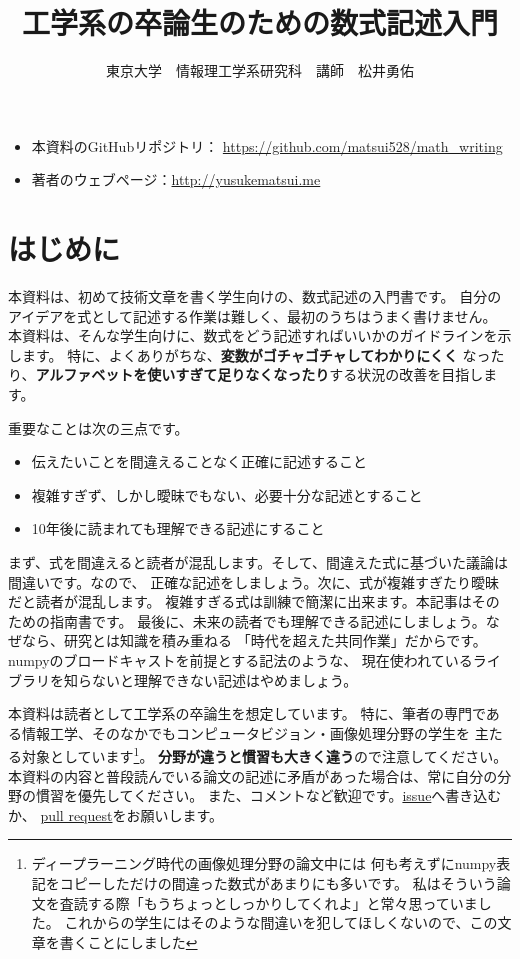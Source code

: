 \documentclass[uplatex,twocolumn,9pt,dvipdfmx]{jsarticle}
\begin{document}
\title{工学系の卒論生のための数式記述入門}
\author{東京大学　情報理工学系研究科　講師　松井勇佑}
\maketitle

\begin{screen}
    \begin{itemize}
    \item 本資料のGitHubリポジトリ： \url{https://github.com/matsui528/math_writing}
    \item 著者のウェブページ：\url{http://yusukematsui.me}
    \end{itemize}
\end{screen}

\section{はじめに}

本資料は、初めて技術文章を書く学生向けの、数式記述の入門書です。
自分のアイデアを式として記述する作業は難しく、最初のうちはうまく書けません。
本資料は、そんな学生向けに、数式をどう記述すればいいかのガイドラインを示します。
特に、よくありがちな、\textbf{変数がゴチャゴチャしてわかりにくく}
なったり、\textbf{アルファベットを使いすぎて足りなくなったり}する状況の改善を目指します。

重要なことは次の三点です。
\begin{itemize}
    \item 伝えたいことを間違えることなく正確に記述すること
    \item 複雑すぎず、しかし曖昧でもない、必要十分な記述とすること
    \item 10年後に読まれても理解できる記述にすること
\end{itemize}
まず、式を間違えると読者が混乱します。そして、間違えた式に基づいた議論は間違いです。なので、
正確な記述をしましょう。次に、式が複雑すぎたり曖昧だと読者が混乱します。
複雑すぎる式は訓練で簡潔に出来ます。本記事はそのための指南書です。
最後に、未来の読者でも理解できる記述にしましょう。なぜなら、研究とは知識を積み重ねる
「時代を超えた共同作業」だからです。numpyのブロードキャストを前提とする記法のような、
現在使われているライブラリを知らないと理解できない記述はやめましょう。


本資料は読者として工学系の卒論生を想定しています。
特に、筆者の専門である情報工学、そのなかでもコンピュータビジョン・画像処理分野の学生を
主たる対象としています\footnote{
ディープラーニング時代の画像処理分野の論文中には
何も考えずにnumpy表記をコピーしただけの間違った数式があまりにも多いです。
私はそういう論文を査読する際「もうちょっとしっかりしてくれよ」と常々思っていました。
これからの学生にはそのような間違いを犯してほしくないので、この文章を書くことにしました}。
\textbf{分野が違うと慣習も大きく違う}ので注意してください。
本資料の内容と普段読んでいる論文の記述に矛盾があった場合は、常に自分の分野の慣習を優先してください。
また、コメントなど歓迎です。\href{https://github.com/matsui528/math_writing/issues}{issue}へ書き込むか、
\href{https://github.com/matsui528/math_writing/pulls}{pull request}をお願いします。
\end{document}
